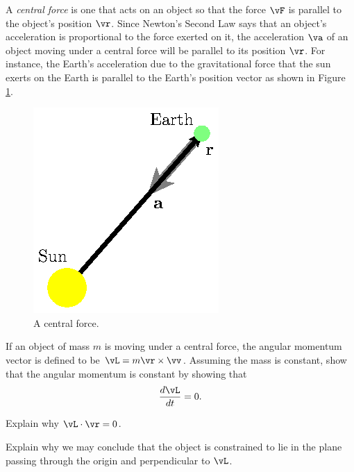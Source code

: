 \begin{activity} \label{A:9.7.9} A {\em central force} is one that
  acts on an object so that the force $\vF$ is parallel to the
  object's position $\vr$.  Since Newton's Second Law says that an
  object's acceleration is proportional to the force exerted on it,
  the acceleration $\va$ of an object moving under a central force
  will be parallel to its position $\vr$.  For instance, the Earth's
  acceleration due to the 
  gravitational force that the sun exerts on the Earth is parallel to
  the Earth's position vector as shown in Figure \ref{F:9.7.sun}.

\begin{figure}[ht]
  \begin{center}
    \includegraphics{figures/fig_9_7_sun.eps}
    \caption{A central force.}
    \label{F:9.7.sun}
  \end{center}
\end{figure}

\ba
\item If an object of mass $m$ is moving under a central force, 
  the angular momentum vector is defined to be $\vL=m\vr\times\vv$.
  Assuming the mass is constant, show that the angular momentum is
  constant by showing that
  $$
  \frac{d\vL}{dt} = 0.
  $$

\item Explain why $\vL\cdot\vr = 0$.

\item Explain why we may conclude that the object is constrained to
  lie in the plane passing through the origin and perpendicular to
  $\vL$.





\ea

\end{activity}
